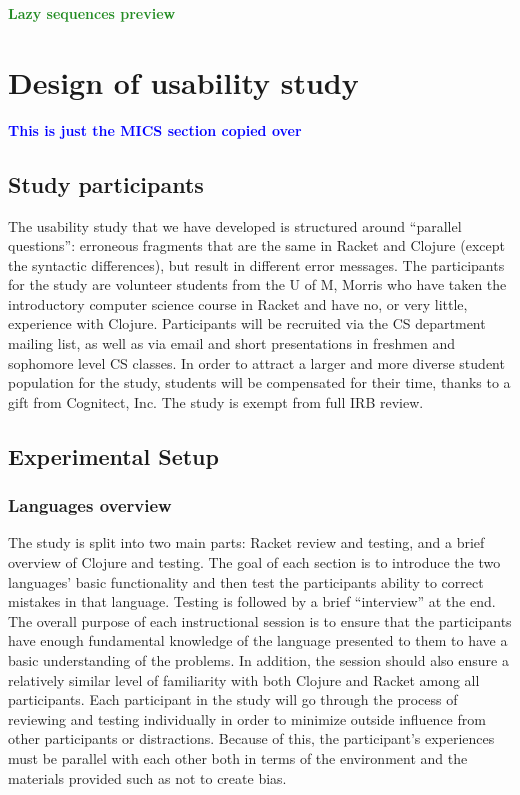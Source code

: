 \documentclass[submission,copyright,creativecommons]{eptcs}
\newcommand{\allcomments}[1]{{#1}}
\newcommand{\emcomment}[1]{{\bf \textcolor{ForestGreen}{\allcomments{{#1}}}}}
\newcommand{\thcomment}[1]{{\bf \textcolor{blue}{\allcomments{{#1}}}}}
\begin{document}
\emcomment{Lazy sequences preview}

\section{Design of usability study}\label{sec:study}
	\thcomment{This is just the MICS section copied over}
	
	\subsection{Study participants}\label{sec:obj}
The usability study that we have developed is structured around ``parallel questions'': erroneous fragments that are the same in 
Racket and Clojure (except the syntactic differences), but result in different error messages.  
The participants for the study are volunteer students from the U of M, Morris who have taken the introductory computer science course in Racket and have no, or very little, experience with Clojure.
Participants will be recruited via the CS department mailing list, as well as via email and short presentations in freshmen and sophomore level CS classes. 
In order to attract a larger and more diverse student population for the study, students will be compensated for their time, thanks to a gift from Cognitect, Inc. 
The study is exempt from full IRB review. 

	\subsection{Experimental Setup}\label{sec:setup}
	
	   


\subsubsection{Languages overview}\label{subsec:overview}

The study is split into two main parts: Racket review and testing, and a brief overview of Clojure and testing.
The goal of each section is to introduce the two languages' basic functionality and then test the participants ability to correct mistakes in that language.
Testing is followed by a brief ``interview'' at the end. 
The overall purpose of each instructional session is to ensure that the participants have enough fundamental knowledge of the language presented to them to have a basic understanding of the problems. 
In addition, the session should also ensure a relatively similar level of familiarity with both Clojure and Racket among all participants. 
Each participant in the study will go through the process of reviewing and testing individually in order to minimize outside influence from other participants or distractions. 
Because of this, the participant's experiences must be parallel with each other both in terms of the environment and the materials provided such as not to create bias.
\end{document}
